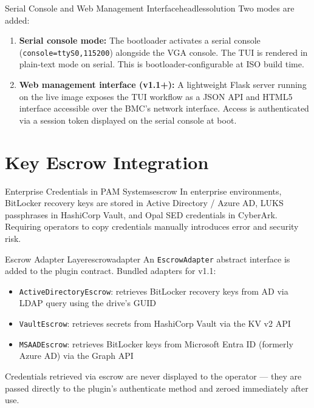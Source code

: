 \documentclass[11pt,a4paper]{report}
\begin{document}
\begin{solution}{Serial Console and Web Management Interface}{headlessolution}
Two modes are added:
\begin{enumerate}[noitemsep]
  \item \textbf{Serial console mode:} The bootloader activates a serial console (\texttt{console=ttyS0,115200}) alongside the VGA console. The TUI is rendered in plain-text mode on serial. This is bootloader-configurable at ISO build time.
  \item \textbf{Web management interface (v1.1+):} A lightweight Flask server running on the live image exposes the TUI workflow as a JSON API and HTML5 interface accessible over the BMC's network interface. Access is authenticated via a session token displayed on the serial console at boot.
\end{enumerate}
\end{solution}

\section{Key Escrow Integration}

\begin{edgecase}{Enterprise Credentials in PAM Systems}{escrow}
In enterprise environments, BitLocker recovery keys are stored in Active Directory / Azure AD, LUKS passphrases in HashiCorp Vault, and Opal SED credentials in CyberArk. Requiring operators to copy credentials manually introduces error and security risk.
\end{edgecase}

\begin{solution}{Escrow Adapter Layer}{escrowadapter}
An \texttt{EscrowAdapter} abstract interface is added to the plugin contract. Bundled adapters for v1.1:
\begin{itemize}[noitemsep]
  \item \texttt{ActiveDirectoryEscrow}: retrieves BitLocker recovery keys from AD via LDAP query using the drive's GUID
  \item \texttt{VaultEscrow}: retrieves secrets from HashiCorp Vault via the KV v2 API
  \item \texttt{MSAADEscrow}: retrieves BitLocker keys from Microsoft Entra ID (formerly Azure AD) via the Graph API
\end{itemize}
Credentials retrieved via escrow are never displayed to the operator --- they are passed directly to the plugin's authenticate method and zeroed immediately after use.
\end{solution}
\end{document}
